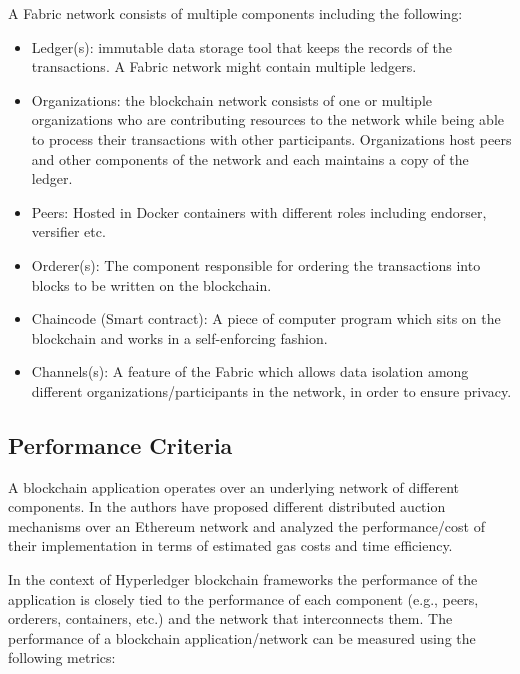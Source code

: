 \documentclass[conference]{IEEEtran}
\begin{document}
A Fabric network consists of multiple components including the following:

\begin{itemize}
    \item Ledger(s): immutable data storage tool that keeps the records of the transactions. A Fabric network might contain multiple ledgers.
    \item Organizations: the blockchain network consists of one or multiple organizations who are contributing resources to the network while being able to process their transactions with other participants. Organizations host peers and other components of the network and each maintains a copy of the ledger.
    \item Peers: Hosted in Docker containers with different roles including endorser, versifier etc.
    \item Orderer(s): The component responsible for ordering the transactions into blocks to be written on the blockchain.
    \item Chaincode (Smart contract): A piece of computer program which sits on the blockchain and works in a self-enforcing fashion.
    \item Channels(s): A feature of the Fabric which allows data isolation among different organizations/participants in the network, in order to ensure privacy.
\end{itemize}






\subsection{Performance Criteria}
A blockchain application operates over an underlying network of different components. In \cite{10.1007/978-3-030-16946-6_5,10.1007/978-3-662-58820-8_18} the authors have proposed different distributed auction mechanisms over an Ethereum network and analyzed the performance/cost of their implementation in terms of estimated gas costs and time efficiency. 

In the context of Hyperledger blockchain frameworks the performance of the application is closely tied to the performance of each component (e.g., peers, orderers, containers, etc.) and the network that interconnects them. The performance of a blockchain application/network can be measured using the following metrics:
\end{document}
